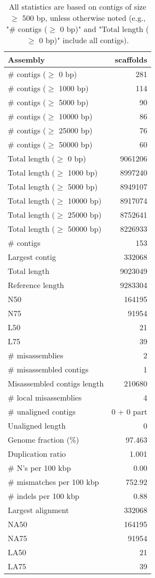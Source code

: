 \documentclass[12pt,a4paper]{article}
\begin{document}
\begin{table}[ht]
\begin{center}
\caption{All statistics are based on contigs of size $\geq$ 500 bp, unless otherwise noted (e.g., "\# contigs ($\geq$ 0 bp)" and "Total length ($\geq$ 0 bp)" include all contigs).}
\begin{tabular}{|l*{1}{|r}|}
\hline
Assembly & scaffolds \\ \hline
\# contigs ($\geq$ 0 bp) & 281 \\ \hline
\# contigs ($\geq$ 1000 bp) & 114 \\ \hline
\# contigs ($\geq$ 5000 bp) & 90 \\ \hline
\# contigs ($\geq$ 10000 bp) & 86 \\ \hline
\# contigs ($\geq$ 25000 bp) & 76 \\ \hline
\# contigs ($\geq$ 50000 bp) & 60 \\ \hline
Total length ($\geq$ 0 bp) & 9061206 \\ \hline
Total length ($\geq$ 1000 bp) & 8997240 \\ \hline
Total length ($\geq$ 5000 bp) & 8949107 \\ \hline
Total length ($\geq$ 10000 bp) & 8917074 \\ \hline
Total length ($\geq$ 25000 bp) & 8752641 \\ \hline
Total length ($\geq$ 50000 bp) & 8226933 \\ \hline
\# contigs & 153 \\ \hline
Largest contig & 332068 \\ \hline
Total length & 9023049 \\ \hline
Reference length & 9283304 \\ \hline
N50 & 164195 \\ \hline
N75 & 91954 \\ \hline
L50 & 21 \\ \hline
L75 & 39 \\ \hline
\# misassemblies & 2 \\ \hline
\# misassembled contigs & 1 \\ \hline
Misassembled contigs length & 210680 \\ \hline
\# local misassemblies & 4 \\ \hline
\# unaligned contigs & 0 + 0 part \\ \hline
Unaligned length & 0 \\ \hline
Genome fraction (\%) & 97.463 \\ \hline
Duplication ratio & 1.001 \\ \hline
\# N's per 100 kbp & 0.00 \\ \hline
\# mismatches per 100 kbp & 752.92 \\ \hline
\# indels per 100 kbp & 0.88 \\ \hline
Largest alignment & 332068 \\ \hline
NA50 & 164195 \\ \hline
NA75 & 91954 \\ \hline
LA50 & 21 \\ \hline
LA75 & 39 \\ \hline
\end{tabular}
\end{center}
\end{table}
\end{document}
